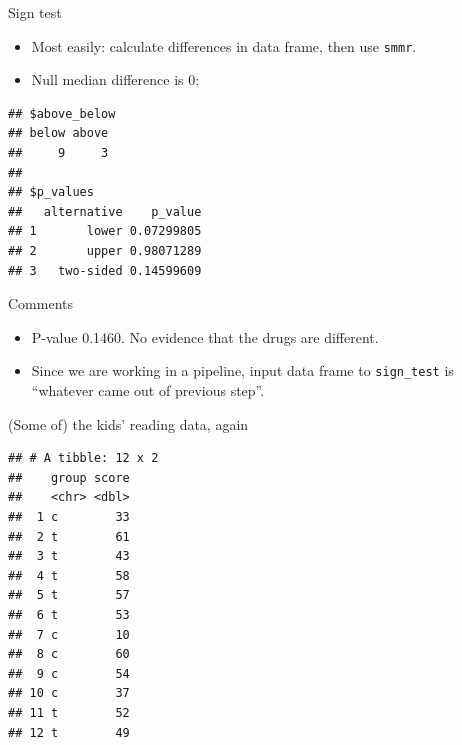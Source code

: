 \documentclass[ignorenonframetext,]{beamer}
\newenvironment{Shaded}{\begin{snugshade}}{\end{snugshade}}
\newcommand{\DataTypeTok}[1]{\textcolor[rgb]{0.13,0.29,0.53}{#1}}
\newcommand{\DecValTok}[1]{\textcolor[rgb]{0.00,0.00,0.81}{#1}}
\newcommand{\KeywordTok}[1]{\textcolor[rgb]{0.13,0.29,0.53}{\textbf{#1}}}
\newcommand{\NormalTok}[1]{#1}
\newcommand{\OperatorTok}[1]{\textcolor[rgb]{0.81,0.36,0.00}{\textbf{#1}}}
\newcommand{\StringTok}[1]{\textcolor[rgb]{0.31,0.60,0.02}{#1}}
\providecommand{\tightlist}{%
  \setlength{\itemsep}{0pt}\setlength{\parskip}{0pt}}
\begin{document}
\begin{frame}[fragile]{Sign test}
\protect\hypertarget{sign-test}{}

\begin{itemize}
\tightlist
\item
  Most easily: calculate differences in data frame, then use
  \texttt{smmr}.
\item
  Null median difference is 0:
\end{itemize}

\begin{Shaded}
\end{Shaded}

\begin{verbatim}
## $above_below
## below above 
##     9     3 
## 
## $p_values
##   alternative    p_value
## 1       lower 0.07299805
## 2       upper 0.98071289
## 3   two-sided 0.14599609
\end{verbatim}

\end{frame}

\begin{frame}[fragile]{Comments}
\protect\hypertarget{comments-7}{}

\begin{itemize}
\tightlist
\item
  P-value 0.1460. No evidence that the drugs are different.
\item
  Since we are working in a pipeline, input data frame to
  \texttt{sign\_test} is ``whatever came out of previous step''.
\end{itemize}

\end{frame}

\begin{frame}[fragile]{(Some of) the kids' reading data, again}
\protect\hypertarget{some-of-the-kids-reading-data-again}{}

\begin{Shaded}
\end{Shaded}

\begin{verbatim}
## # A tibble: 12 x 2
##    group score
##    <chr> <dbl>
##  1 c        33
##  2 t        61
##  3 t        43
##  4 t        58
##  5 t        57
##  6 t        53
##  7 c        10
##  8 c        60
##  9 c        54
## 10 c        37
## 11 t        52
## 12 t        49
\end{verbatim}

\end{frame}
\end{document}
